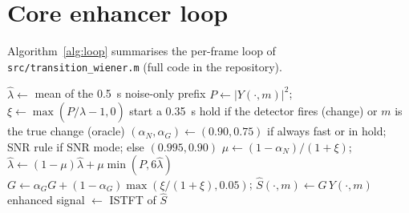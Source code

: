 \documentclass[10pt,conference,a4paper]{IEEEtran}
\begin{document}
\section{Core enhancer loop}
\label{app:code}
Algorithm~\ref{alg:loop} summarises the per-frame loop of
\texttt{src/transition\_wiener.m} (full code in the repository).

\begin{algorithm}[H]
\caption{Per-frame Wiener update with controller (simplified)}
\label{alg:loop}
\scriptsize
\begin{algorithmic}[1]
\State $\hat\lambda \gets$ mean of the 0.5~s noise-only prefix
  \State $P \gets |Y(\cdot,m)|^2$;\; $\xi \gets \max(P/\hat\lambda-1,0)$
  \State start a 0.35~s hold if the detector fires (change) or $m$ is the true change (oracle)
  \State $(\alpha_N,\alpha_G) \gets (0.90,0.75)$ if always fast or in hold; SNR rule if SNR mode; else $(0.995,0.90)$
  \State $\mu \gets (1-\alpha_N)/(1+\xi)$;\; $\hat\lambda \gets (1-\mu)\hat\lambda+\mu\min(P,6\hat\lambda)$
  \State $G \gets \alpha_G G+(1-\alpha_G)\max(\xi/(1+\xi),0.05)$;\; $\hat S(\cdot,m) \gets G\,Y(\cdot,m)$
\EndFor
\State enhanced signal $\gets$ ISTFT of $\hat S$
\end{algorithmic}
\end{algorithm}
\end{document}
